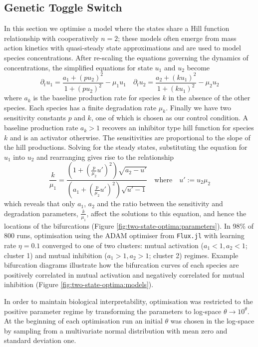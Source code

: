 \subsection{Genetic Toggle Switch}
In this section we optimise a model where the states share a Hill function relationship with cooperatively $n=2$; these models often emerge from mass action kinetics with quasi-steady state approximations and are used to model species concentrations. After re-scaling the equations governing the dynamics of concentrations, the simplified equations for state $u_1$ and $u_2$ become 
\begin{equation}
    \partial_t u_1 = \frac{ a_1 + (p u_2)^2}{ 1 + (p u_2)^2 } - \mu_1 u_1 \quad
    \partial_t u_2 = \frac{ a_2 + (k u_1)^2}{ 1 + (k u_1)^2 } - \mu_2 u_2
    \label{eq:two-state}
\end{equation}
where $a_k$ is the baseline production rate for species $k$ in the absence of the other species. Each species has a finite degradation rate $\mu_k$. Finally we have two sensitivity constants $p$ and $k$, one of which is chosen as our control condition. A baseline production rate $a_k>1$ recovers an inhibitor type hill function for species $k$ and is an activator otherwise. The sensitivities are proportional to the slope of the hill productions. Solving for the steady states,  substituting the equation for $u_1$ into $u_2$ and rearranging gives rise to the relationship
\begin{equation}
    \dfrac{k}{\mu_1} = \dfrac{(1 + (\frac{p}{\mu_2} u')^2) \sqrt{a_2 - u'} }{ (a_1 + (\frac{p}{\mu_2} u')^2) \sqrt{ u' - 1 } }
    \quad\mathrm{where}\quad u':= u_2\mu_2
    \label{eq:steady-states}
\end{equation}
which reveals that only $a_1$, $a_2$ and the ratio between the sensitivity and degradation parameters, $\frac{k}{\mu_1}$, affect the solutions to this equation, and hence the locations of the bifurcations (Figure \ref{fig:two-state-optima:parameters}). In 98\% of 800 runs, optimisation using the ADAM optimiser \cite{Kingma2014} from \texttt{Flux.jl} with learning rate $\eta=0.1$ converged to one of two clusters: mutual activation ($a_1 < 1, a_2 < 1$; cluster 1) and mutual inhibition ($a_1 > 1, a_2 > 1$; cluster 2) regimes. Example bifurcation diagrams illustrate how the bifurcation curves of each species are positively correlated in mutual activation and negatively correlated for mutual inhibition (Figure \ref{fig:two-state-optima:models}).

In order to maintain biological interpretability, optimisation was restricted to the positive parameter regime by transforming the parameters to log-space $\theta\rightarrow10^\theta$. At the beginning of each optimisation run an initial $\theta$ was chosen in the log-space by sampling from a multivariate normal distribution with mean zero and standard deviation one.

